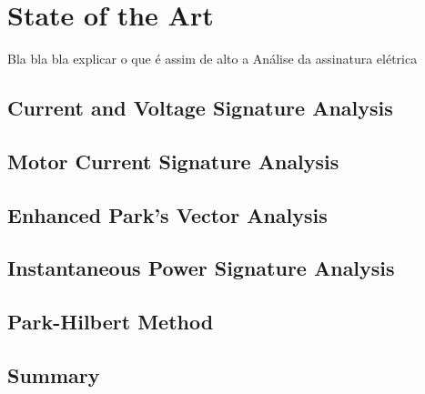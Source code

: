 \chapter{State of the Art}
\label{cha:state_of_the_art}

Bla bla bla explicar o que é assim de alto a Análise da assinatura elétrica

\section{Current and Voltage Signature Analysis} %
\label{sec:predictive_maintenance_by_eletrical_signature_analysis}

\section{Motor Current Signature Analysis} %
\label{sec:predictive_maintenance_by_eletrical_signature_analysis}

\section{Enhanced Park's Vector Analysis} %
\label{sec:predictive_maintenance_by_eletrical_signature_analysis}

\section{Instantaneous Power Signature Analysis} %
\label{sec:predictive_maintenance_by_eletrical_signature_analysis}

\section{Park-Hilbert Method} %
\label{sec:predictive_maintenance_by_eletrical_signature_analysis}

\section{Summary} %
\label{sec:related_work_summary}
